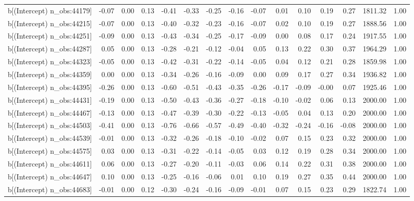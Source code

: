 \begin{table}[ht]
\begin{tabular}{rrrrrrrrrrrrrrr}
  b[(Intercept) n\_obs:44179] & -0.07 & 0.00 & 0.13 & -0.41 & -0.33 & -0.25 & -0.16 & -0.07 & 0.01 & 0.10 & 0.19 & 0.27 & 1811.32 & 1.00 \\ 
  b[(Intercept) n\_obs:44215] & -0.07 & 0.00 & 0.13 & -0.40 & -0.32 & -0.23 & -0.16 & -0.07 & 0.02 & 0.10 & 0.19 & 0.27 & 1888.56 & 1.00 \\ 
  b[(Intercept) n\_obs:44251] & -0.09 & 0.00 & 0.13 & -0.43 & -0.34 & -0.25 & -0.17 & -0.09 & 0.00 & 0.08 & 0.17 & 0.24 & 1917.55 & 1.00 \\ 
  b[(Intercept) n\_obs:44287] & 0.05 & 0.00 & 0.13 & -0.28 & -0.21 & -0.12 & -0.04 & 0.05 & 0.13 & 0.22 & 0.30 & 0.37 & 1964.29 & 1.00 \\ 
  b[(Intercept) n\_obs:44323] & -0.05 & 0.00 & 0.13 & -0.42 & -0.31 & -0.22 & -0.14 & -0.05 & 0.04 & 0.12 & 0.21 & 0.28 & 1859.98 & 1.00 \\ 
  b[(Intercept) n\_obs:44359] & 0.00 & 0.00 & 0.13 & -0.34 & -0.26 & -0.16 & -0.09 & 0.00 & 0.09 & 0.17 & 0.27 & 0.34 & 1936.82 & 1.00 \\ 
  b[(Intercept) n\_obs:44395] & -0.26 & 0.00 & 0.13 & -0.60 & -0.51 & -0.43 & -0.35 & -0.26 & -0.17 & -0.09 & -0.00 & 0.07 & 1925.46 & 1.00 \\ 
  b[(Intercept) n\_obs:44431] & -0.19 & 0.00 & 0.13 & -0.50 & -0.43 & -0.36 & -0.27 & -0.18 & -0.10 & -0.02 & 0.06 & 0.13 & 2000.00 & 1.00 \\ 
  b[(Intercept) n\_obs:44467] & -0.13 & 0.00 & 0.13 & -0.47 & -0.39 & -0.30 & -0.22 & -0.13 & -0.05 & 0.04 & 0.13 & 0.20 & 2000.00 & 1.00 \\ 
  b[(Intercept) n\_obs:44503] & -0.41 & 0.00 & 0.13 & -0.76 & -0.66 & -0.57 & -0.49 & -0.40 & -0.32 & -0.24 & -0.16 & -0.08 & 2000.00 & 1.00 \\ 
  b[(Intercept) n\_obs:44539] & -0.01 & 0.00 & 0.13 & -0.32 & -0.26 & -0.18 & -0.10 & -0.02 & 0.07 & 0.15 & 0.23 & 0.32 & 2000.00 & 1.00 \\ 
  b[(Intercept) n\_obs:44575] & 0.03 & 0.00 & 0.13 & -0.31 & -0.22 & -0.14 & -0.05 & 0.03 & 0.12 & 0.19 & 0.28 & 0.34 & 2000.00 & 1.00 \\ 
  b[(Intercept) n\_obs:44611] & 0.06 & 0.00 & 0.13 & -0.27 & -0.20 & -0.11 & -0.03 & 0.06 & 0.14 & 0.22 & 0.31 & 0.38 & 2000.00 & 1.00 \\ 
  b[(Intercept) n\_obs:44647] & 0.10 & 0.00 & 0.13 & -0.25 & -0.16 & -0.06 & 0.01 & 0.10 & 0.19 & 0.27 & 0.35 & 0.44 & 2000.00 & 1.00 \\ 
  b[(Intercept) n\_obs:44683] & -0.01 & 0.00 & 0.12 & -0.30 & -0.24 & -0.16 & -0.09 & -0.01 & 0.07 & 0.15 & 0.23 & 0.29 & 1822.74 & 1.00 \\ 

\end{tabular}
\end{table}
